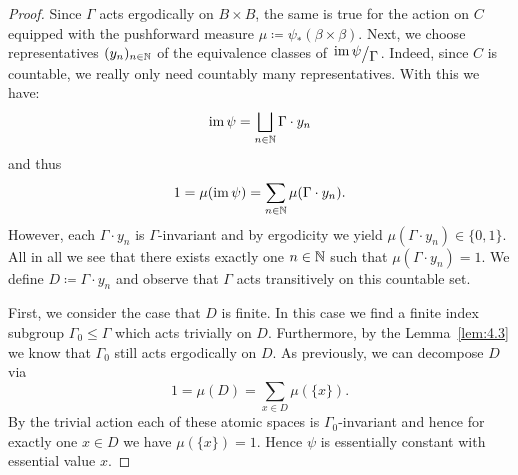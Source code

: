 \begin{proof}
  Since \(\Gamma\) acts ergodically on \(B \times B\), the same is true for the action on \(C\) equipped with the pushforward measure \(\mu \coloneqq \psi_\ast(\beta \times \beta)\). Next, we choose representatives \((y_n)_{n \in \mathbb{N}}\) of the equivalence classes of \(\quot{\im \psi}{\Gamma}\). Indeed, since \(C\) is countable, we really only need countably many representatives. With this we have:
  \[
    \operatorname{im} \psi = \bigsqcup_{n \in \mathbb{N}} \Gamma \cdot y_n
  \]
  and thus
  \[
    1 = \mu(\operatorname{im} \psi) = \sum_{n \in \mathbb{N}} \mu(\Gamma \cdot y_n).
  \]
  However, each \(\Gamma \cdot y_n\) is \(\Gamma\)-invariant and by ergodicity we yield \(\mu(\Gamma \cdot y_n) \in \{0,1\}\). All in all we see that there exists exactly one \(n \in \mathbb{N}\) such that \(\mu(\Gamma \cdot y_n) = 1\). We define \(D \coloneqq \Gamma \cdot y_n\) and observe that \(\Gamma\) acts transitively on this countable set.

  First, we consider the case that \(D\) is finite. In this case we find a finite index subgroup \(\Gamma_0 \leq \Gamma\) which acts trivially on \(D\). Furthermore, by the Lemma~\ref{lem:4.3} we know that \(\Gamma_0\) still acts ergodically on \(D\). As previously, we can decompose \(D\) via
  \[
    1 = \mu(D) = \sum_{x \in D} \mu(\{x\}).
  \]
  By the trivial action each of these atomic spaces is \(\Gamma_0\)-invariant and hence for exactly one \(x \in D\) we have \(\mu(\{x\}) = 1\). Hence \(\psi\) is essentially constant with essential value \(x\).


\end{proof}
